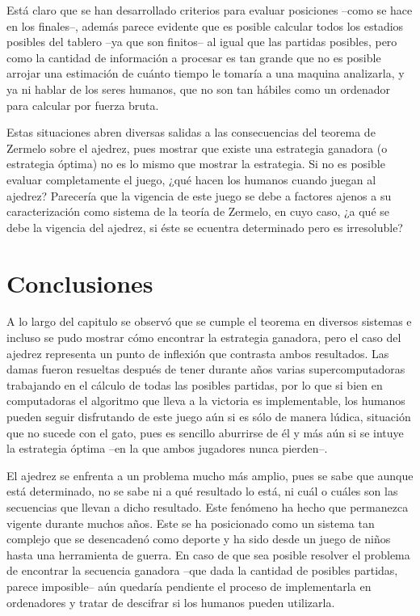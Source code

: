 \documentclass[twoside,openright,12pt,a4paper,spanish]{book}
\begin{document}
Está claro que se han desarrollado criterios para evaluar posiciones --como se hace en los finales--, además parece evidente que es posible calcular todos los estadios posibles del tablero --ya que son finitos-- al igual que las partidas posibles, pero como la cantidad de información a procesar es tan grande que no es posible arrojar una estimación de cuánto tiempo le tomaría a una maquina analizarla, y ya ni hablar de los seres humanos, que no son tan hábiles como un ordenador para calcular por fuerza bruta.

Estas situaciones abren diversas salidas a las consecuencias del teorema de Zermelo sobre el ajedrez, pues mostrar que existe una estrategia ganadora (o estrategia óptima) no es lo mismo que mostrar la estrategia. Si no es posible evaluar completamente el juego, ¿qué hacen los humanos cuando juegan al ajedrez? Parecería que la vigencia de este juego se debe a factores ajenos a su caracterización como sistema de la teoría de Zermelo, en cuyo caso, ¿a qué se debe la vigencia del ajedrez, si éste se ecuentra determinado pero es irresoluble?

\section{Conclusiones}

A lo largo del capitulo se observ\'o que se cumple el teorema en diversos sistemas e incluso se pudo mostrar cómo encontrar la estrategia ganadora, pero el caso del ajedrez representa un punto de inflexi\'on que contrasta ambos resultados. Las damas fueron resueltas después de tener durante años varias supercomputadoras trabajando en el c\'alculo de todas las posibles partidas, por lo que si bien en computadoras el algoritmo que lleva a la victoria es implementable, los humanos pueden seguir disfrutando de este juego a\'un si es s\'olo de manera l\'udica, situaci\'on que no sucede con el gato, pues es sencillo aburrirse de él y m\'as a\'un si se intuye la estrategia óptima --en la que ambos jugadores nunca pierden--.

El ajedrez se enfrenta a un problema mucho m\'as amplio, pues se sabe que aunque est\'a determinado, no se sabe ni a qu\'e resultado lo est\'a, ni cu\'al o cuáles son las secuencias que llevan a dicho resultado. Este fenómeno ha hecho que permanezca vigente durante muchos años. Este se ha posicionado como un sistema tan complejo que se desencaden\'o como deporte y ha sido desde un juego de niños hasta una herramienta de guerra. En caso de que sea posible resolver el problema de encontrar la secuencia ganadora --que dada la cantidad de posibles partidas, parece imposible-- a\'un quedar\'ia pendiente el proceso de implementarla en ordenadores y tratar de descifrar si los humanos pueden utilizarla.
\end{document}
